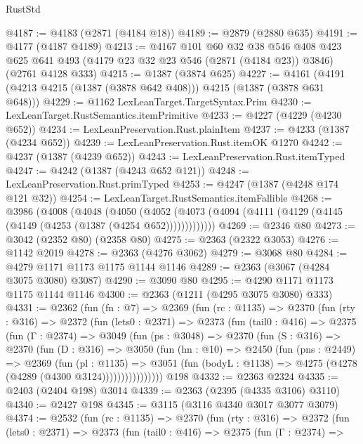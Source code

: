 \begin{lexlean}{RustStd}
\begin{coremodule}
@4187 := @4183 (@2871 (@4184 @18))
@4189 := @2879 (@2880 @635)
@4191 := @4177 (@4187 @4189)
@4213 := @4167
    @101
    @60
    @32
    @38
    @546
    @408
    @423
    @625
    @641
    @493
    (@4179 @23 @32 @23 @546 (@2871 (@4184 @23)) @3846)
    (@2761 @4128 @333)
@4215 := @1387 (@3874 @625)
@4227 := @4161 (@4191 (@4213 @4215 (@1387 (@3878 @642 @408))) @4215 (@1387 (@3878 @631 @648)))
@4229 := @1162 LexLeanTarget.TargetSyntax.Prim
@4230 := LexLeanTarget.RustSemantics.itemPrimitive
@4233 := @4227 (@4229 (@4230 @652))
@4234 := LexLeanPreservation.Rust.plainItem
@4237 := @4233 (@1387 (@4234 @652))
@4239 := LexLeanPreservation.Rust.itemOK @1270
@4242 := @4237 (@1387 (@4239 @652))
@4243 := LexLeanPreservation.Rust.itemTyped
@4247 := @4242 (@1387 (@4243 @652 @121))
@4248 := LexLeanPreservation.Rust.primTyped
@4253 := @4247 (@1387 (@4248 @174 @121 @32))
@4254 := LexLeanTarget.RustSemantics.itemFallible
@4268 := @3986
    (@4008
      (@4048
        (@4050
          (@4052 (@4073 (@4094 (@4111 (@4129 (@4145 (@4149 (@4253 (@1387 (@4254 @652)))))))))))))
@4269 := @2346 @80
@4273 := @3042 (@2352 @80) (@2358 @80)
@4275 := @2363 (@2322 @3053)
@4276 := @1142 @2019
@4278 := @2363 (@4276 @3062)
@4279 := @3068 @80
@4284 := @4279 @1171 @1173 @1175 @1144 @1146
@4289 := @2363 (@3067 (@4284 @3075 @3080) @3087)
@4290 := @3090 @80
@4295 := @4290 @1171 @1173 @1175 @1144 @1146
@4300 := @2363 (@1211 (@4295 @3075 @3080) @333)
@4331 := @2362
    (fun (fn : @7) =>
    @2369
      (fun (rc : @1135) =>
      @2370
        (fun (rty : @316) =>
        @2372
          (fun (lets0 : @2371) =>
          @2373
            (fun (tail0 : @416) =>
            @2375
              (fun (Γ : @2374) =>
              @3049
                (fun (ps : @3048) =>
                @2370
                  (fun (S : @316) =>
                  @2370
                    (fun (D : @316) =>
                    @3050
                      (fun (hn : @10) =>
                      @2450
                        (fun (pns : @2449) =>
                        @2369
                          (fun (pl : @1135) =>
                          @3051
                            (fun (bodyL : @1138) => @4275 (@4278 (@4289 (@4300 @3124))))))))))))))))
    @198
@4332 := @2363 @2324
@4335 := @2403 (@2404 @198) @3014
@4339 := @2363 (@2395 (@4335 @3106) @3110)
@4340 := @2427 @198
@4345 := @3115 (@3116 @4340 @3017 @3077 @3079)
@4374 := @2532
    (fun (rc : @1135) =>
    @2370
      (fun (rty : @316) =>
      @2372
        (fun (lets0 : @2371) =>
        @2373
          (fun (tail0 : @416) =>
          @2375
            (fun (Γ : @2374) =>

\end{coremodule}
\end{lexlean}

